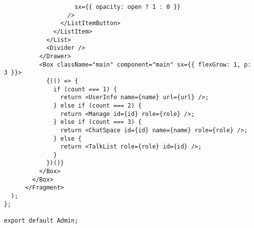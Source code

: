\begin{verbatim}
                    sx={{ opacity: open ? 1 : 0 }}
                  />
                </ListItemButton>
              </ListItem>
            </List>
            <Divider />
          </Drawer>
          <Box className="main" component="main" sx={{ flexGrow: 1, p: 3 }}>
            {(() => {
              if (count === 1) {
                return <UserInfo name={name} url={url} />;
              } else if (count === 2) {
                return <Manage id={id} role={role} />;
              } else if (count === 3) {
                return <ChatSpace id={id} name={name} role={role} />;
              } else {
                return <TalkList role={role} id={id} />;
              }
            })()}
          </Box>
        </Box>
      </Fragment>
  );
};

export default Admin;

\end{verbatim}